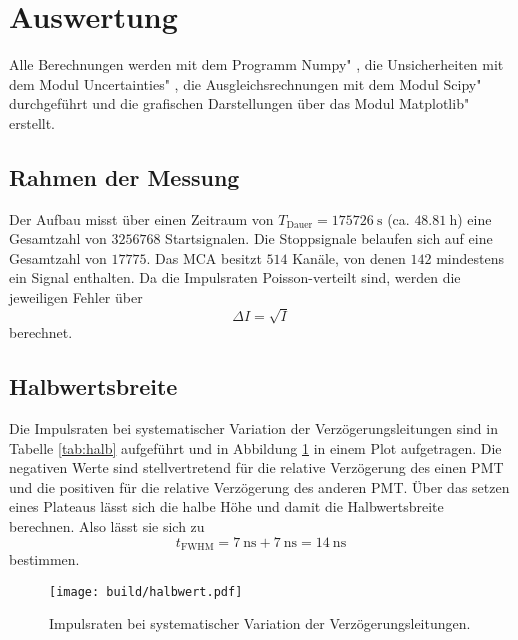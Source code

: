 \section{Auswertung}
\label{sec:Auswertung}
Alle Berechnungen werden mit dem Programm \glqq Numpy" \cite{numpy}, die Unsicherheiten mit dem Modul \glqq Uncertainties" \cite{uncertainties}, die Ausgleichsrechnungen mit dem Modul \glqq Scipy" \cite{scipy} durchgeführt und die grafischen Darstellungen über das Modul \glqq Matplotlib" \cite{matplotlib} erstellt.


\subsection{Rahmen der Messung}
Der Aufbau misst über einen Zeitraum von $T_\text{Dauer} = \SI{175726}{\s}$ (ca. $\SI{48.81}{\hour}$) eine Gesamtzahl von $\num{3256768}$ Startsignalen. Die Stoppsignale belaufen sich auf eine Gesamtzahl von $\num{17775}$. Das MCA besitzt $\num{514}$ Kanäle, von denen $\num{142}$ mindestens ein Signal enthalten. Da die Impulsraten Poisson-verteilt sind, werden die jeweiligen Fehler über 
\begin{equation*}
    \Delta I = \sqrt{I}
\end{equation*}
berechnet.

\subsection{Halbwertsbreite}

Die Impulsraten bei systematischer Variation der Verzögerungsleitungen sind in Tabelle \ref{tab:halb} aufgeführt und in Abbildung \ref{fig:halb} in einem Plot aufgetragen. Die negativen Werte sind stellvertretend für die relative Verzögerung des einen PMT und die positiven für die relative Verzögerung des anderen PMT. Über das setzen eines Plateaus lässt sich die halbe Höhe und damit die Halbwertsbreite berechnen.
Also lässt sie sich zu
\begin{equation}
    t_\text{FWHM} = \SI{7}{\nano\s}+\SI{7}{\nano\s} = \SI{14}{\nano\s}
\end{equation}
bestimmen.


\begin{figure}[h]
    \centering
    \texttt{[image: build/halbwert.pdf]}
    \caption{Impulsraten bei systematischer Variation der Verzögerungsleitungen.}
    \label{fig:halb}
\end{figure}

